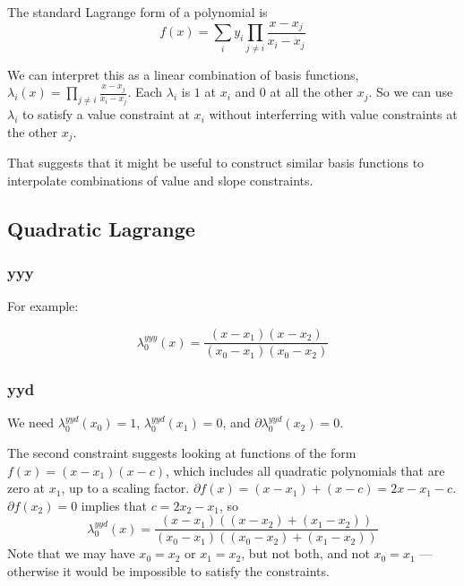 The standard Lagrange form of a polynomial is
\begin{equation}
f(x) = \sum_{i} y_i \prod_{j \neq i} \frac{x - x_j}{x_i -x_j}
\end{equation}

We can interpret this as a linear combination of basis functions,
$\lambda_i (x) = \prod_{j \neq i} \frac{x - x_j}{x_i -x_j}$.
Each $\lambda_i$ is $1$ at $x_i$ and $0$ at all the other $x_j$.
So we can use $\lambda_i$ to satisfy a value constraint at $x_i$
without interferring with value constraints at the other $x_j$.

That suggests that it might be useful to construct similar basis
functions to interpolate combinations of value and slope 
constraints.

\subsection{Quadratic Lagrange}

\subsubsection{yyy}

For example:

\begin{equation}
\lambda^{yyy}_0(x) = 
\frac {(x - x_1) (x - x_2)} {(x_0 - x_1) (x_0 - x_2)}
\end{equation}

\subsubsection{yyd}

We need 
$\lambda^{yyd}_0(x_0) = 1$, 
$\lambda^{yyd}_0(x_1) = 0$, and
$\partial\lambda^{yyd}_0(x_2) = 0$. 

The second constraint suggests looking at functions of the form
$f(x) = (x - x_1) (x - c)$, which includes all quadratic 
polynomials that are zero at $x_1$, up to a scaling factor.  
$\partial{f}(x) = (x - x_1) + (x - c) = 2 x - x_1 - c$.
$\partial{f}(x_2) = 0$ implies that
$c = 2 x_2 - x_1$,
so
\begin{equation}
\lambda^{yyd}_0(x) = 
\frac 
{(x - x_1) \left( (x - x_2) + (x_1 - x_2) \right)} 
{(x_0 - x_1) ((x_0 - x_2) + (x_1 - x_2))}
\end{equation}
Note that we may have $x_0 = x_2$ or $x_1 = x_2$, but not both,
and not $x_0 = x_1$ --- otherwise it would be impossible to 
satisfy the constraints.

